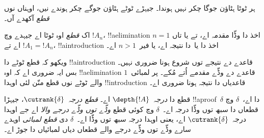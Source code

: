 \documentclass[../../../include/open-logic-section]{subfiles}
\begin{document}
ہر ٹوٹا ہٹاؤن جوگا چکر نہیں ہوندا۔ جیہڑے ٹوٹے ہٹاؤن جوگے چکر ہوندے نیں، اوہناں نوں \emph{قطع} آکھدے آں۔

\begin{defn}
اک \emph{قطع} اوہ ٹوٹا اے جیہدے وچ $!A_n$، !!a{elimination} اخذ دا وڈّا مقدمہ اے، تے یا تاں $n=1$ اے تے $!A_1 = !A_n$، !!a{introduction} اخذ دا یا~\FalseInt دا نتیجہ اے، یا فیر~$n>1$ اے۔
\end{defn}

ویکھو کہ قطع ٹوٹے دا !!a{introduction} قاعدے دے نتیجے توں شروع ہونا ضروری نہیں۔ بس ایہ ضروری اے کہ اوہ !!a{elimination} قاعدے دے وڈّے مقدمے اُتے مُکے۔ پر لمبائی~$1$ والے ٹوٹے نوں قطع منّن لئی اوہدا !!{introduction} قاعدیاں دا نتیجہ ہونا ضروری اے۔

\begin{defn}
قطع دا \emph{درجہ}~$\depth{!A}$ اے۔ \emph{قطع درجہ}~$\cutrank{\delta}$، جیہڑا !!a{proof}~$\delta$ دا اے،~$\delta$ وچ قطعاں دا سبھ توں وڈّا درجہ اے۔~$\delta$ وچ کوئی قطع \emph{وڈّے توں وڈّے درجے والا} اے جے اوہدا درجہ~$\cutrank{\delta}$ اے، یعنی اوہدا درجہ سبھ توں وڈّا اے۔~$\delta$ دی \emph{قطع لمبائی} اوہدے سارے وڈّے توں وڈّے درجے والے قطعاں دیاں لمبائیاں دا جوڑ اے۔
\end{defn}
\end{document}
